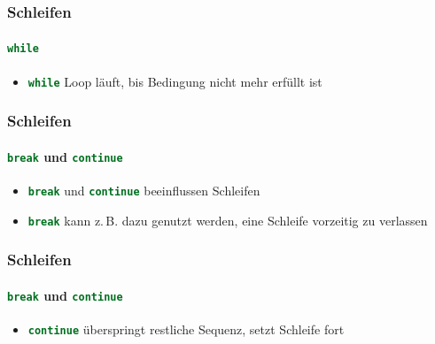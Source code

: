 \documentclass[ngerman]{beamer}
\newcommand{\ta}[1]{\textattachfile[color=1 0 0]{#1}{Code}}
\begin{document}
\begin{frame}[containsverbatim]
\frametitle{Schleifen}
\framesubtitle{\lstinline[language={Python}]{while}}

\begin{itemize}
\item \lstinline[language={Python}]{while} Loop läuft, bis Bedingung nicht mehr erfüllt ist
\end{itemize}



\end{frame}

\begin{frame}[containsverbatim]
\frametitle{Schleifen}
\framesubtitle{\lstinline[language={Python}]{break} und \lstinline[language={Python}]{continue}}

\begin{itemize}
\item \lstinline[language={Python}]{break} und \lstinline[language={Python}]{continue} beeinflussen Schleifen
\item \lstinline[language={Python}]{break} kann z.\,B. dazu genutzt werden, eine Schleife \newline vorzeitig zu verlassen
\end{itemize}



\end{frame}

\begin{frame}[containsverbatim]
\frametitle{Schleifen}
\framesubtitle{\lstinline[language={Python}]{break} und \lstinline[language={Python}]{continue}}

\begin{itemize}
\item \lstinline[language={Python}]{continue} überspringt restliche Sequenz, setzt Schleife fort 
\end{itemize}

%

\end{frame}
\end{document}
